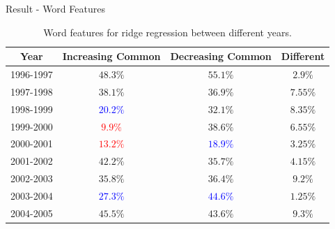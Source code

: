 \documentclass{beamer}
\begin{document}
\begin{frame}{Result - Word Features}

  \begin{table}[H]
    \centering
    \begin{tabular}{|c|c|c|c|}
      \hline
      Year      & Increasing Common          & Decreasing Common          & Different \\
      \hline
      1996-1997 & $48.3\%$                   & $55.1\%$                   & $2.9\%$   \\
      \hline
      1997-1998 & $38.1\%$                   & $36.9\%$                   & $7.55\%$  \\
      \hline
      1998-1999 & \textcolor{blue}{$20.2\%$} & $32.1\%$                   & $8.35\%$  \\
      \hline
      1999-2000 & \textcolor{red}{$9.9\%$}   & $38.6\%$                   & $6.55\%$  \\
      \hline
      2000-2001 & \textcolor{red}{$13.2\%$}  & \textcolor{blue}{$18.9\%$} & $3.25\%$  \\
      \hline
      2001-2002 & $42.2\%$                   & $35.7\%$                   & $4.15\%$  \\
      \hline
      2002-2003 & $35.8\%$                   & $36.4\%$                   & $9.2\%$   \\
      \hline
      2003-2004 & \textcolor{blue}{$27.3\%$} & \textcolor{blue}{$44.6\%$} & $1.25\%$  \\
      \hline
      2004-2005 & $45.5\%$                   & $43.6\%$                   & $9.3\%$   \\
      \hline
    \end{tabular}
    \caption{Word features for ridge regression between different years.}
  \end{table}

\end{frame}
\end{document}
